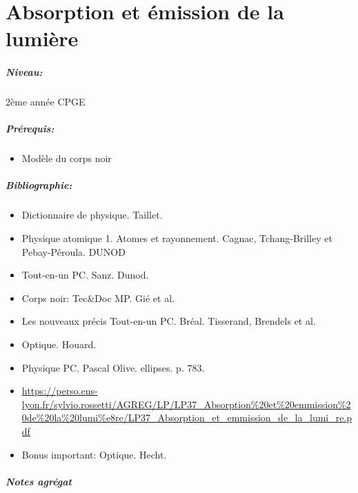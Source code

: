 \documentclass[11pt]{report}
\numberwithin{figure}{section}
\numberwithin{equation}{section}
\numberwithin{table}{section}
\newcommand{\1}{\boldsymbol{1}}
\begin{document}
\begin{tcolorbox}[breakable, enhanced, colback=red!2!white,colframe=mycolor!85!black,title=\textbf{\textbf{Expérience}}]
\end{tcolorbox}


\newpage



\chapter{Absorption et émission de la lumière}


\paragraph*{Niveau:} 2ème année CPGE

\paragraph*{Prérequis:} 
\begin{itemize}
\item Modèle du corps noir
\end{itemize}

\paragraph*{Bibliographie:}
\begin{itemize}
\item Dictionnaire de physique. Taillet.
\item Physique atomique 1. Atomes et rayonnement. Cagnac, Tchang-Brilley et Pebay-Péroula. DUNOD
\item Tout-en-un PC. Sanz. Dunod.
\item Corps noir: Tec\&Doc MP. Gié et al.
\item Les nouveaux précis Tout-en-un PC. Bréal. Tisserand, Brendels et al.
\item Optique. Houard.
\item Physique PC. Pascal Olive. ellipses. p. 783.
\item \url{https://perso.ens-lyon.fr/sylvio.rossetti/AGREG/LP/LP37_Absorption%20et%20emmission%20de%20la%20lumi%e8re/LP37_Absorption_et_emmission_de_la_lumi_re.pdf}
\item Bonus important: Optique. Hecht. 
\end{itemize}

\paragraph{Notes agrégat}
\end{document}
